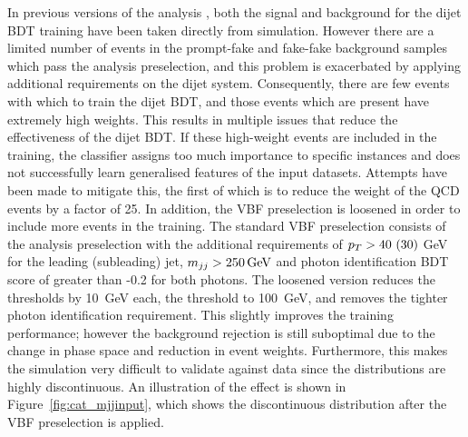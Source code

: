 In previous versions of the analysis \cite{HIG-16-040}, 
both the signal and background for the dijet BDT training have been taken directly from simulation. 
However there are a limited number of events in the prompt-fake and fake-fake background samples 
which pass the analysis preselection, 
and this problem is exacerbated by applying additional requirements on the dijet system.
Consequently, there are few events with which to train the dijet BDT, 
and those events which are present have extremely high weights.
This results in multiple issues that reduce the effectiveness of the dijet BDT.
If these high-weight events are included in the training, 
the classifier assigns too much importance to specific instances 
and does not successfully learn generalised features of the input datasets.
Attempts have been made to mitigate this, 
the first of which is to reduce the weight of the QCD events by a factor of 25.
In addition, the VBF preselection is loosened in 
order to include more events in the training.
The standard VBF preselection consists of the analysis preselection 
with the additional requirements of $p_T > 40~(30)$ GeV for the leading (subleading) jet, 
$m_{jj} > \SI{250}{GeV}$ and photon identification BDT score of greater than -0.2 for both photons.
The loosened version reduces the \pt thresholds by \SI{10}{GeV} each, 
the \mjj threshold to \SI{100}{GeV}, and removes the tighter photon identification requirement.
This slightly improves the training performance; 
however the background rejection is still suboptimal 
due to the change in phase space and reduction in event weights.
Furthermore, this makes the simulation very difficult to validate against data
since the distributions are highly discontinuous.
An illustration of the effect is shown in Figure~\ref{fig:cat_mjjinput}, 
which shows the discontinuous \mjj distribution after the VBF preselection is applied.

